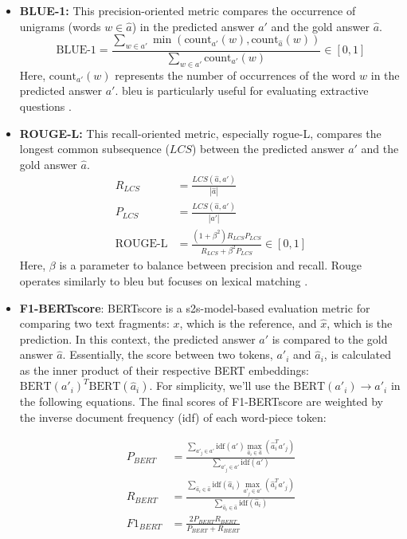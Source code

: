\begin{itemize}
    \item \textbf{BLUE-1:} This precision-oriented metric compares the occurrence of unigrams (words $w \in \hat{a}$) in the predicted answer $a'$ and the gold answer $\hat{a}$.
    \begin{equation}
        \text{BLUE-1} = \frac{\sum_{w \in a'} \min(\text{count}_{a'}(w), \text{count}_{\hat{a}}(w))}{\sum_{w \in a'} \text{count}_{a'}(w)} \in [0,1]
    \end{equation}
    Here, $\text{count}_{a'}(w)$ represents the number of occurrences of the word $w$ in the predicted answer $a'$. \gls{bleu} is particularly useful for evaluating extractive questions \cite{papineni_bleu_2002}.

    \item \textbf{ROUGE-L:} This recall-oriented metric, especially \gls{rogue}-L, compares the longest common subsequence ($LCS$) between the predicted answer $a'$ and the gold answer $\hat{a}$.
    \begin{align}
        R_{LCS} &= \frac{LCS(\hat{a}, a')}{|\hat{a}|} \\
        P_{LCS} &= \frac{LCS(\hat{a}, a')}{|a'|} \\
        \text{ROUGE-L} &= \frac{(1+\beta^2)R_{LCS}P_{LCS}}{R_{LCS}+\beta^2P_{LCS}} \in [0,1]
    \end{align}
    Here, $\beta$ is a parameter to balance between precision and recall. Rouge operates similarly to \gls{bleu} but focuses on lexical matching \cite{lin_rouge_2004}.

    \item \textbf{F1-BERTscore}: BERTscore is a \gls{s2s}-model-based evaluation metric for comparing two text fragments: $x$, which is the reference, and $\hat{x}$, which is the prediction. In this context, the predicted answer $a'$ is compared to the gold answer $\hat{a}$. Essentially, the score between two tokens, $a'_i$ and $\hat{a}_i$, is calculated as the inner product of their respective BERT embeddings: $\text{BERT}(a'_i)^T\text{BERT}(\hat{a}_i)$. For simplicity, we'll use the  $\text{BERT}(a'_i) \rightarrow a'_i$ in the following equations. The final scores of F1-BERTscore are weighted by the inverse document frequency (idf) of each word-piece token:

    \begin{align}
        P_{BERT} &= \frac{\sum_{a'_j\in a'} \text{idf}(a') \max_{\hat{a}_i \in \hat{a}} (\hat{a}_i^T a'_j)}{\sum_{a'_j\in a'} \text{idf}(a')} \\
        R_{BERT} &= \frac{\sum_{\hat{a}_i \in \hat{a}} \text{idf}(\hat{a}_i) \max_{a'_j \in a'} (\hat{a}_i^T a'_j)}{\sum_{\hat{a}_i \in \hat{a}} \text{idf}(\hat{a}_i)} \\
        F1_{BERT} &= \frac{2P_{BERT}R_{BERT}}{P_{BERT}+R_{BERT}}
    \end{align}
    

\end{itemize}
